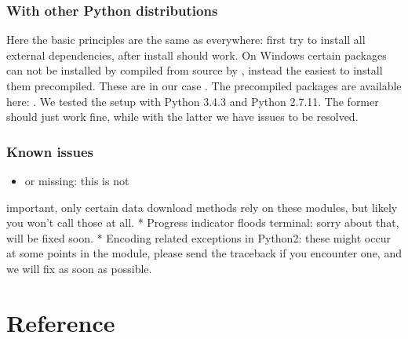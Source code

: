 \documentclass[letterpaper,10pt,english]{sphinxmanual}
\begin{document}
\subsection{With other Python distributions}
\label{\detokenize{installation:with-other-python-distributions}}
Here the basic principles are the same as everywhere: first try to install all
external dependencies, after  install should work. On Windows certain
packages can not be installed by compiled from source by , instead the
easiest to install them precompiled. These are in our case . The
precompiled packages are available here:
. We tested the setup with Python
3.4.3 and Python 2.7.11. The former should just work fine, while with the
latter we have issues to be resolved.


\subsection{Known issues}
\label{\detokenize{installation:known-issues}}\begin{itemize}
\item {} 
 \textendash{} or  missing: this is not

\end{itemize}

important, only certain data download methods rely on these modules, but
likely you won’t call those at all.
* Progress indicator floods terminal: sorry about that, will be fixed soon.
* Encoding related exceptions in Python2: these might occur at some points in
the module, please send the traceback if you encounter one, and we will fix
as soon as possible.



\chapter{Reference}
\label{\detokenize{main:module-pypath.main}}\label{\detokenize{main:reference}}\label{\detokenize{main::doc}}
\end{document}
